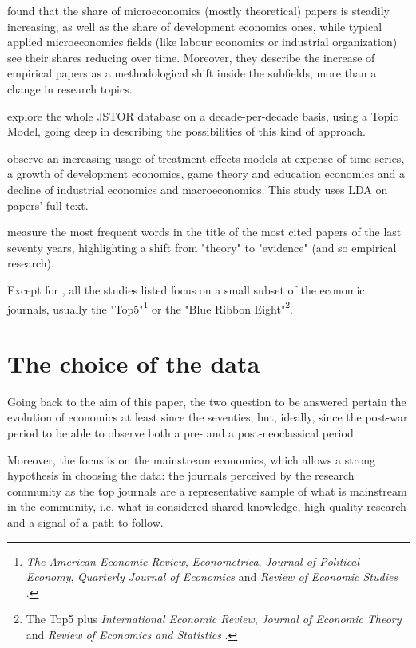 \documentclass[a4paper, 11pt, headings=standardclasses, tablecaptionsbelow]{scrartcl}
\begin{document}
\textcite{angrist2017} found that the share of microeconomics (mostly theoretical) papers is steadily increasing, as well as the share of development economics ones, while typical applied microeconomics fields (like labour economics or industrial organization) see their shares reducing over time.
Moreover, they describe the increase of empirical papers as a methodological shift inside the subfields, more than a change in research topics.

\textcite{ambrosino2018} explore the whole JSTOR database on a decade-per-decade basis, using a Topic Model, going deep in describing the possibilities of this kind of approach.

\textcite{fontana2019} observe an increasing usage of treatment effects models at expense of time series, a growth of development economics, game theory and education economics and a decline of industrial economics and macroeconomics. This study uses LDA on papers' full-text.

\textcite{montesinos2019} measure the most frequent words in the title of the most cited papers of the last seventy years, highlighting a shift from "theory" to "evidence" (and so empirical research).

Except for \textcite{ambrosino2018}, all the studies listed focus on a small subset of the economic journals, usually the "Top5"\footnote{\textit{The American Economic Review}, \textit{Econometrica}, \textit{Journal of Political Economy}, \textit{Quarterly Journal of Economics} and \textit{Review of Economic Studies} \parencite{heckman2020}.} or the "Blue Ribbon Eight"\footnote{The Top5 plus \textit{International Economic Review}, \textit{Journal of Economic Theory} and \textit{Review of Economics and Statistics} \parencite{dusansky1998}.}.

\section{The choice of the data}
Going back to the aim of this paper, the two question to be answered pertain the evolution of economics at least since the seventies, but, ideally, since the post-war period to be able to observe both a pre- and a post-neoclassical period.

Moreover, the focus is on the mainstream economics, which allows a strong hypothesis in choosing the data: the journals perceived by the research community as the top journals are a representative sample of what is mainstream in the community, i.e. what is considered shared knowledge, high quality research and a signal of a path to follow.
\end{document}
